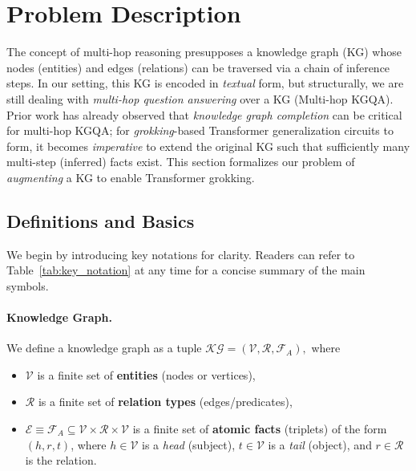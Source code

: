 \section{Problem Description} \label{sec:problem_description}
    
    The concept of multi-hop reasoning presupposes a knowledge graph (KG) whose nodes (entities) and edges (relations) can be traversed via a chain of inference steps. In our setting, this KG is encoded in \emph{textual} form, but structurally, we are still dealing with \emph{multi-hop question answering} over a KG (Multi-hop KGQA). Prior work \citep{liu_joint_2022} has already observed that \emph{knowledge graph completion} can be critical for multi-hop KGQA; for \emph{grokking}-based Transformer generalization circuits to form, it becomes \emph{imperative} to extend the original KG such that sufficiently many multi-step (inferred) facts exist. This section formalizes our problem of \emph{augmenting} a KG to enable Transformer grokking.
    
    \subsection{Definitions and Basics} \label{subsec:definitions_basics}
        
        We begin by introducing key notations for clarity. Readers can refer to Table~\ref{tab:key_notation} at any time for a concise summary of the main symbols.
        
        \paragraph{Knowledge Graph.}
            \begin{definition}
                \label{def:kg}
                We define a knowledge graph as a tuple 
                \(
                    \mathcal{KG} = (\mathcal{V}, \mathcal{R}, \mathcal{F}_A),
                \)
                where
                \begin{itemize}
                    \item \(\mathcal{V}\) is a finite set of \textbf{entities} (nodes or vertices),
                    \item \(\mathcal{R}\) is a finite set of \textbf{relation types} (edges/predicates),
                    \item \(\mathcal{E} \equiv \mathcal{F}_A \subseteq \mathcal{V} \times \mathcal{R} \times \mathcal{V}\) 
                          is a finite set of \textbf{atomic facts} (triplets) of the form 
                          \((h,r,t)\), where \(h \in \mathcal{V}\) is a \emph{head} (subject), 
                          \(t \in \mathcal{V}\) is a \emph{tail} (object), and \(r \in \mathcal{R}\) is the relation.
                \end{itemize}
            \end{definition}
        
